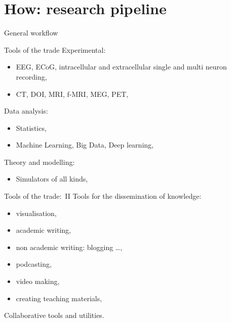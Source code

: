 \section{How: research pipeline}
\begin{frame}[c]{General workflow}
  \begin{figure}[h]
    \centering
  \end{figure}
\end{frame}
\begin{frame}[c]{Tools of the trade}
  \textcolor{FedoraBlue}{Experimental:}
    \begin{itemize}
      \item EEG, ECoG, intracellular and extracellular single and multi neuron recording,
      \item CT, DOI, MRI, f-MRI, MEG, PET,
    \end{itemize}
    \pause{}
  \textcolor{FriendsMagenta}{Data analysis:}
    \begin{itemize}
      \item Statistics,
      \item Machine Learning, Big Data, Deep learning,
    \end{itemize}
    \pause{}
  \textcolor{FeaturesOrange}{Theory} and \textcolor{FirstGreen}{modelling:}
    \begin{itemize}
      \item Simulators of all kinds, 
    \end{itemize}
\end{frame}
\begin{frame}[c]{Tools of the trade:\ II}
  \textcolor{FedoraDarkBlue}{Tools for the dissemination of knowledge\footnotemark[4]:}
  \begin{itemize}
    \item visualisation,
    \item academic writing,
    \item non academic writing: blogging \ldots,
    \item podcasting,
    \item video making,
    \item creating teaching materials,
  \end{itemize}
  \pause{}
  \textcolor{FirstGreen}{Collaborative tools and utilities.}
\end{frame}
